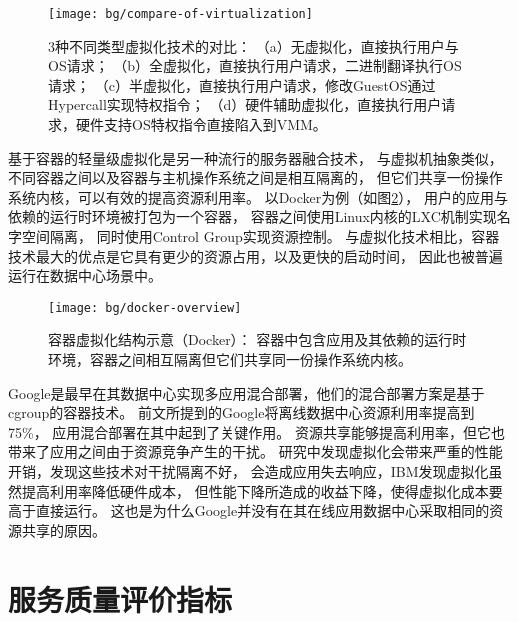 \begin{figure}[t]
  \centering
  \texttt{[image: bg/compare-of-virtualization]}
  \caption[3种不同类型虚拟化技术的对比]{3种不同类型虚拟化技术的对比：
    （a）无虚拟化，直接执行用户与OS请求；
    （b）全虚拟化，直接执行用户请求，二进制翻译执行OS请求；
    （c）半虚拟化，直接执行用户请求，修改GuestOS通过Hypercall实现特权指令；
    （d）硬件辅助虚拟化，直接执行用户请求，硬件支持OS特权指令直接陷入到VMM。}
  \label{fig:compare-of-virt}
\end{figure}

基于容器的轻量级虚拟化是另一种流行的服务器融合技术，
与虚拟机抽象类似，不同容器之间以及容器与主机操作系统之间是相互隔离的，
但它们共享一份操作系统内核，可以有效的提高资源利用率。
以Docker为例（如图\ref{fig:docker-overview}），
用户的应用与依赖的运行时环境被打包为一个容器，
容器之间使用Linux内核的LXC\cite{lxc}机制实现名字空间隔离，
同时使用Control Group\cite{cgroup}实现资源控制。
与虚拟化技术相比，容器技术最大的优点是它具有更少的资源占用，以及更快的启动时间，
因此也被普遍运行在数据中心场景中。

\begin{figure}[htb]
  \centering
  \begin{minipage}{0.75\textwidth}
    \texttt{[image: bg/docker-overview]}
    \caption[容器虚拟化结构示意（Docker）]{容器虚拟化结构示意（Docker）：
      容器中包含应用及其依赖的运行时环境，容器之间相互隔离但它们共享同一份操作系统内核。}
    \label{fig:docker-overview}
  \end{minipage}
\end{figure}


Google是最早在其数据中心实现多应用混合部署，他们的混合部署方案是基于cgroup的容器技术。
前文所提到的Google将离线数据中心资源利用率提高到75\%，
应用混合部署在其中起到了关键作用。
资源共享能够提高利用率，但它也带来了应用之间由于资源竞争产生的干扰。
研究\cite{}中发现虚拟化会带来严重的性能开销，\cite{}发现这些技术对干扰隔离不好，
会造成应用失去响应，IBM发现虚拟化虽然提高利用率降低硬件成本，
但性能下降所造成的收益下降，使得虚拟化成本要高于直接运行\cite{}。
这也是为什么Google并没有在其在线应用数据中心采取相同的资源共享的原因。


\section{服务质量评价指标}



